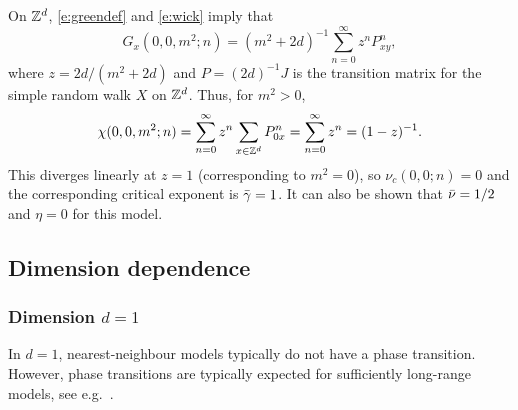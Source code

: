 \begin{example}
\label{ex:gff-asymp}
On ${ {{\mathbb Z}}^d }$, \eqref{e:greendef} and \eqref{e:wick} imply that
\begin{equation}
G_x(0, 0, m^2; n)
	=
(m^2 + 2 d)^{-1} \sum_{n=0}^\infty z^n P^n_{xy},
\end{equation}
where $z = 2 d / (m^2 + 2 d)$ and $P = (2 d)^{-1} J$
is the transition matrix for the simple random walk $X$ on ${ {{\mathbb Z}}^d }$.
Thus, for $m^2 > 0$,
\begin{equation}
\chi(0, 0, m^2; n)
  =
\sum_{n=0}^\infty z^n \sum_{x\in{ {{\mathbb Z}}^d }} P^n_{0x}
  =
\sum_{n=0}^\infty z^n
  =
(1 - z)^{-1}.
\end{equation}
This diverges linearly at $z = 1$ (corresponding to $m^2 = 0$),
so $\nu_c(0, 0; n) = 0$ and the corresponding critical exponent is
$\bar\gamma = 1$. It can also be shown that $\bar\nu = 1/2$ and $\eta = 0$ for this model.
\end{example}


\subsection{Dimension dependence}
\label{sec:dimension}

\subsubsection{Dimension $d = 1$}

In $d = 1$, nearest-neighbour models typically do not have a phase transition.
However, phase transitions are typically expected for sufficiently long-range models,
see e.g.\ \cite{Dyso69}.

